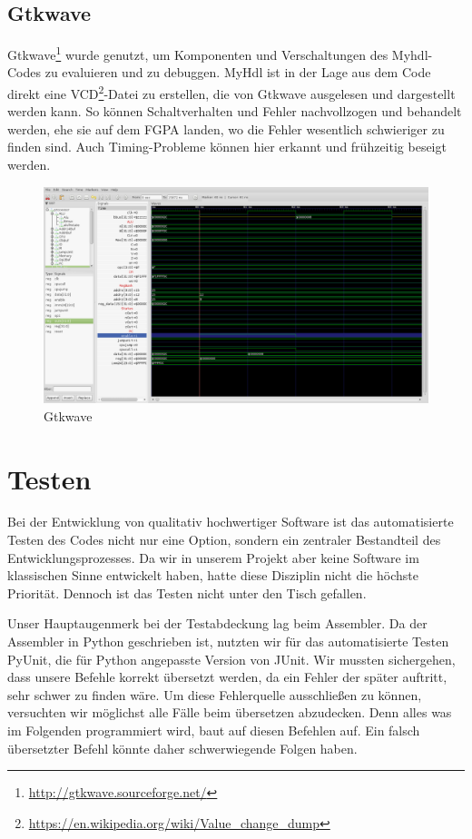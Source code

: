 \subsection{Gtkwave}
Gtkwave\footnote{\url{http://gtkwave.sourceforge.net/}} wurde genutzt, um Komponenten und Verschaltungen des Myhdl-Codes zu evaluieren und zu debuggen. MyHdl ist in der Lage aus dem Code direkt eine VCD\footnote{\url{https://en.wikipedia.org/wiki/Value_change_dump}}-Datei zu erstellen, die von Gtkwave ausgelesen und dargestellt werden kann. So können Schaltverhalten und Fehler nachvollzogen und behandelt werden, ehe sie auf dem FGPA landen, wo die Fehler wesentlich schwieriger zu finden sind. Auch Timing-Probleme können hier erkannt und frühzeitig beseigt werden.
\begin{figure}[H]
\centering
\includegraphics[width=\textwidth]{images/gtkwave.png}
\caption{\label{gen:gtkwave}Gtkwave}
\end{figure}

\section{Testen}
Bei der Entwicklung von qualitativ hochwertiger Software ist das automatisierte Testen des Codes nicht nur eine Option, sondern ein zentraler Bestandteil des Entwicklungsprozesses. Da wir in unserem Projekt aber keine Software im klassischen Sinne entwickelt haben, hatte diese Disziplin nicht die höchste Priorität. Dennoch ist das Testen nicht unter den Tisch gefallen. 

Unser Hauptaugenmerk bei der Testabdeckung lag beim Assembler. Da der Assembler in Python geschrieben ist, nutzten wir  für das automatisierte Testen PyUnit, die für Python angepasste Version von JUnit.
Wir mussten sichergehen, dass unsere Befehle korrekt übersetzt werden, da ein Fehler der später auftritt, sehr schwer zu finden wäre. Um diese Fehlerquelle ausschließen zu können, versuchten wir möglichst alle Fälle beim übersetzen abzudecken. Denn alles was im Folgenden programmiert wird, baut auf diesen Befehlen auf. Ein falsch übersetzter Befehl könnte daher schwerwiegende Folgen haben. 


